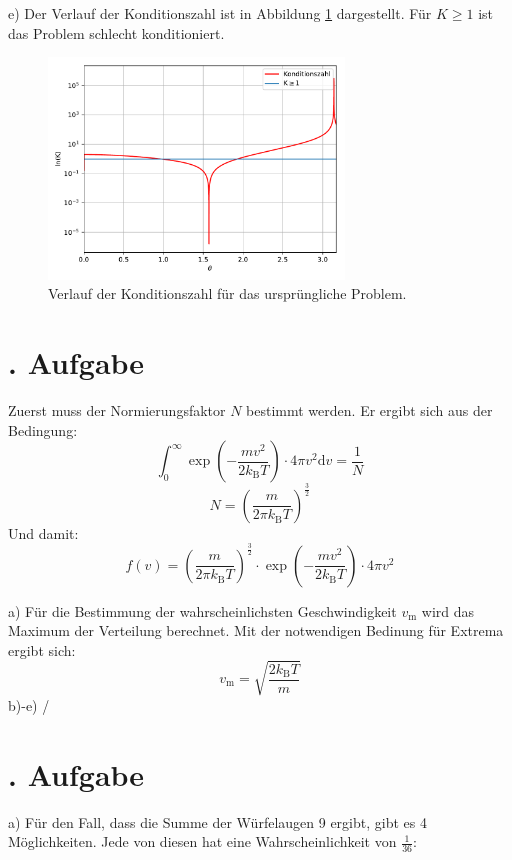 \documentclass[
  bibliography=totoc,     %
  captions=tableheading,  %
  titlepage=firstiscover, %
]{scrartcl}
\begin{document}
\noindent
e) Der Verlauf der Konditionszahl ist in Abbildung \ref{fig:6} dargestellt.
Für $K \geq 1$ ist das Problem schlecht konditioniert.
\begin{figure}[H]
  \centering
  \includegraphics[width=0.7\textwidth]{konditionierung.pdf}
  \caption{Verlauf der Konditionszahl für das ursprüngliche Problem.}
  \label{fig:6}
\end{figure}

\section{. Aufgabe}
\noindent
Zuerst muss der Normierungsfaktor $N$ bestimmt werden.
Er ergibt sich aus der Bedingung:
\begin{equation*}
  \int_0^\infty \exp\left(-\frac{mv^2}{2k_\mathup{B}T}\right)\cdot4\pi v^2 \mathup{d}v = \frac{1}{N}
\end{equation*}
\noindent
\begin{equation*}
  N = \left(\frac{m}{2 \pi k_\mathup{B} T}\right)^\frac{3}{2}
\end{equation*}
Und damit:
\begin{equation*}
  f(v) = \left(\frac{m}{2 \pi k_\mathup{B} T}\right)^\frac{3}{2} \cdot \exp\left(-\frac{mv^2}{2k_\mathup{B}T}\right)\cdot4\pi v^2
\end{equation*}

\noindent
a) Für die Bestimmung der wahrscheinlichsten Geschwindigkeit $v_\mathup{m}$ wird das Maximum der Verteilung
berechnet. Mit der notwendigen Bedinung für Extrema ergibt sich:
\begin{equation*}
  v_\mathup{m} = \sqrt{\frac{2k_\mathup{B}T}{m}}
\end{equation*}
b)-e) /

\section{. Aufgabe}
\noindent
a) Für den Fall, dass die Summe der Würfelaugen 9 ergibt, gibt es 4 Möglichkeiten.
Jede von diesen hat eine Wahrscheinlichkeit von $\frac{1}{36}$:
\end{document}
